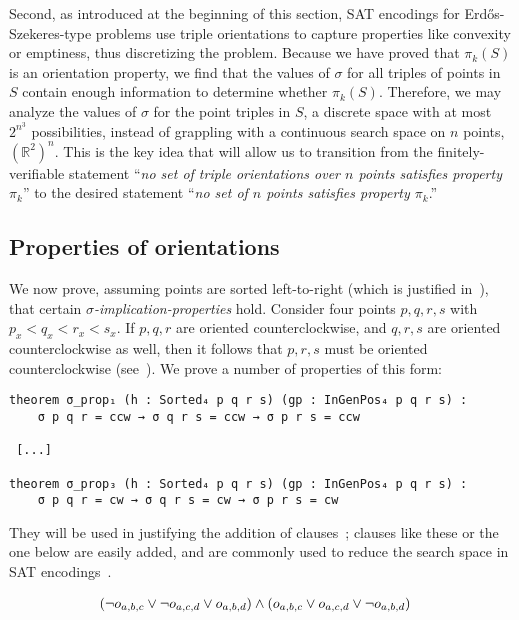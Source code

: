 Second,
as introduced at the beginning of this section,
SAT encodings for Erd\H{o}s-Szekeres-type problems use triple orientations to capture properties like convexity or emptiness,
thus discretizing the problem.
Because we have proved that $\pi_k(S)$ is an orientation property,
we find that the values of $\sigma$ for all triples of points in $S$ contain enough information to determine whether $\pi_k(S)$.
Therefore,
we may analyze the values of $\sigma$ for the point triples in $S$, a discrete space with at most $2^{n^3}$ possibilities,
instead of grappling with a continuous search space on $n$ points, $\left(\mathbb{R}^2\right)^n$.
This is the key idea that will allow us to transition from the finitely-verifiable statement ``\emph{no set of triple orientations over $n$ points satisfies property $\pi_k$}'' to the desired statement ``\emph{no set of $n$ points satisfies property $\pi_k$}.''

\subsection{Properties of orientations}\label{sec:sigma-props}

We now prove,
assuming points are sorted left-to-right (which is justified in~),
that certain \emph{$\sigma$-implication-properties} hold.
Consider four points $p, q, r, s$ with $p_x < q_x < r_x < s_x$.
If $p, q, r$ are oriented counterclockwise,
and $q, r, s$ are oriented counterclockwise as well,
then it follows that $p, r, s$ must be oriented counterclockwise
(see~).
We prove a number of properties of this form:

\begin{lstlisting}
theorem σ_prop₁ (h : Sorted₄ p q r s) (gp : InGenPos₄ p q r s) :
    σ p q r = ccw → σ q r s = ccw → σ p r s = ccw

 [...]

theorem σ_prop₃ (h : Sorted₄ p q r s) (gp : InGenPos₄ p q r s) :
    σ p q r = cw → σ q r s = cw → σ p r s = cw
\end{lstlisting}

They will be used in justifying the addition of clauses~;
clauses like these or the one below are easily added,
and are commonly used to reduce the search space in SAT encodings~\cite{emptyHexagonNumber,scheucherTwoDisjoint5holes2020,subercaseaux2023minimizing, szekeres_peters_2006}.

\begin{align}
  &\left(\neg \orvar_{a, b, c} \lor \neg \orvar_{a, c, d} \lor \orvar_{a, b, d}\right) \land \left(\orvar_{a, b, c} \lor \orvar_{a, c, d} \lor  \neg \orvar_{a, b, d}\right)
\end{align}

